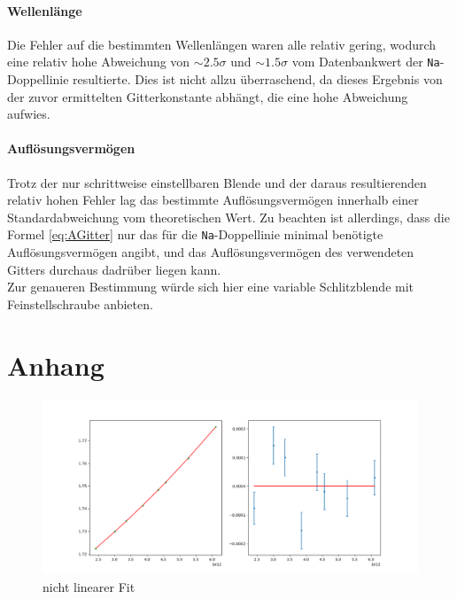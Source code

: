 \documentclass[a4paper, 11pt]{article}
\begin{document}
\paragraph{Wellenlänge}
Die Fehler auf die bestimmten Wellenlängen waren alle relativ gering, wodurch eine relativ hohe Abweichung von $\sim2.5\sigma$ und $\sim 1.5\sigma$ vom Datenbankwert der \texttt{Na}-Doppellinie resultierte. Dies ist nicht allzu überraschend, da dieses Ergebnis von der zuvor ermittelten Gitterkonstante abhängt, die eine hohe Abweichung aufwies.

\paragraph{Auflösungsvermögen}
Trotz der nur schrittweise einstellbaren Blende und der daraus resultierenden relativ hohen Fehler lag das bestimmte Auflösungsvermögen innerhalb einer Standardabweichung vom theoretischen Wert. Zu beachten ist allerdings, dass die Formel \ref{eq:AGitter} nur das für die \texttt{Na}-Doppellinie minimal benötigte Auflösungsvermögen angibt, und das Auflösungsvermögen des verwendeten Gitters durchaus dadrüber liegen kann. \\
Zur genaueren Bestimmung würde sich hier eine variable Schlitzblende mit Feinstellschraube anbieten.


\clearpage
\section{Anhang}
\begin{figure}[H]
	\centering
	\includegraphics[trim = 0mm 0mm 0mm 0mm,clip, width=15cm]{Bilder/nicht_linearer_fit.png}%
	\caption[nicht linearer Fit]{nicht linearer Fit}%
	\label{pic:Abbildung 1}%
\end{figure}
\end{document}
